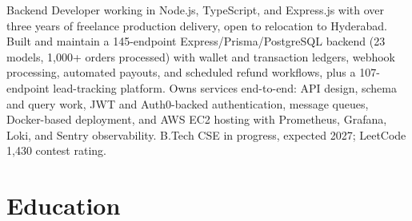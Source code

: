 \documentclass[11pt,a4paper,sans]{moderncv}
\begin{document}
\makecvtitle


\vspace{4pt}
\small{Backend Developer working in Node.js, TypeScript, and Express.js with over three years of freelance production delivery, open to relocation to Hyderabad. Built and maintain a 145-endpoint Express/Prisma/PostgreSQL backend (23 models, 1,000+ orders processed) with wallet and transaction ledgers, webhook processing, automated payouts, and scheduled refund workflows, plus a 107-endpoint lead-tracking platform. Owns services end-to-end: API design, schema and query work, JWT and Auth0-backed authentication, message queues, Docker-based deployment, and AWS EC2 hosting with Prometheus, Grafana, Loki, and Sentry observability. B.Tech CSE in progress, expected 2027; LeetCode 1,430 contest rating.}


\section{Education}
\vspace{1pt}

\end{document}
